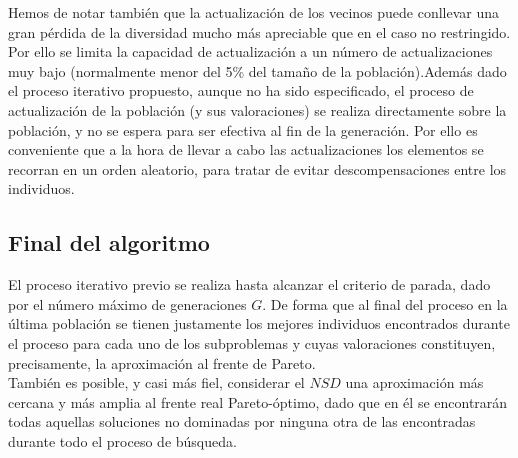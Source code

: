 \begin{enumerate}
      Hemos de notar también que la actualización de los vecinos puede conllevar una gran pérdida de la diversidad mucho más apreciable que en el caso no restringido. Por ello se limita la capacidad de actualización a un número de actualizaciones muy bajo (normalmente menor del 5\% del tamaño de la población).Además dado el proceso iterativo propuesto, aunque no ha sido especificado, el proceso de actualización de la población (y sus valoraciones) se realiza directamente sobre la población, y no se espera para ser efectiva al fin de la generación. Por ello es conveniente que a la hora de llevar a cabo las actualizaciones los elementos se recorran en un orden aleatorio, para tratar de evitar descompensaciones entre los individuos.\\
\end{enumerate}

\subsection{Final del algoritmo}

\justify

El proceso iterativo previo se realiza hasta alcanzar el criterio de parada, dado por el número máximo de generaciones $G$. De forma que al final del proceso en la última población se tienen justamente los mejores individuos encontrados durante el proceso para cada uno de los subproblemas y cuyas valoraciones constituyen, precisamente, la aproximación al frente de Pareto. \\

También es posible, y casi más fiel, considerar el $NSD$ una aproximación más cercana y más amplia al frente real Pareto-óptimo, dado que en él se encontrarán todas aquellas soluciones no dominadas por ninguna otra de las encontradas durante todo el proceso de búsqueda.\\ 


